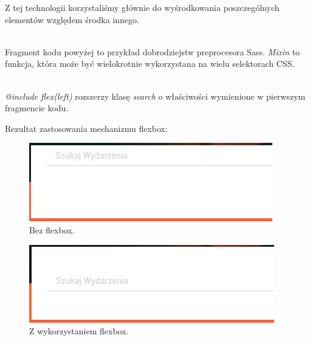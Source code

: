 Z tej technologii korzystaliśmy głównie do wyśrodkowania poszczególnych elementów względem środka innego.

\begin{code}
	
\end{code}\\

Fragment kodu powyżej to przykład dobrodziejstw preprocesora Sass. \emph{Mixin} to funkcja, która może być wielokrotnie wykorzystana na wielu selektorach CSS.

\begin{code}
	
\end{code}\\

\emph{@include flex(left)} rozszerzy klasę \emph{search} o właściwości wymienione w pierwszym fragmencie kodu.

Rezultat zastosowania mechanizmu flexbox:\\
\begin{figure}[h]
	\centering
  \includegraphics[scale=0.8]{images/flex_before.png}
  \caption{Bez flexbox.}
\end{figure}

\begin{figure}[h]
	\centering
  \includegraphics[scale=0.8]{images/flex_after.png}
  \caption{Z wykorzystaniem flexbox.}
\end{figure}

